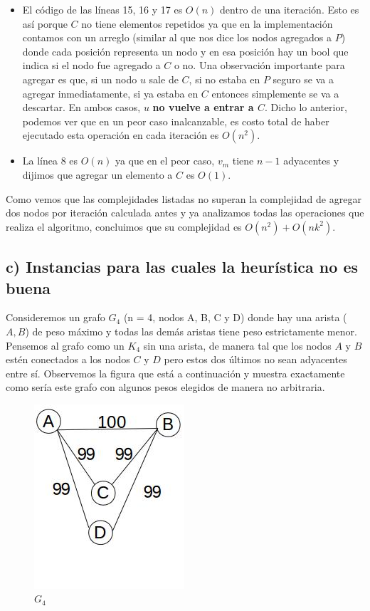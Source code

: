 \documentclass[a4paper]{article}
\begin{document}
\begin{itemize}
\item El código de las líneas 15, 16 y 17 es $O(n)$ dentro de una iteración. Esto es así porque $C$ no tiene elementos repetidos ya que en la implementación contamos con un arreglo (similar al que nos dice los nodos agregados a $P$) donde cada posición representa un nodo y en esa posición hay un bool que indica si el nodo fue agregado a $C$ o no. Una observación importante para agregar es que, si un nodo $u$ sale de $C$, si no estaba en $P$ seguro se va a agregar inmediatamente, si ya estaba en $C$ entonces simplemente se va a descartar. En ambos casos, $u$ \textbf{no vuelve a entrar a $C$}. Dicho lo anterior, podemos ver que en un peor caso inalcanzable, es costo total de haber ejecutado esta operación en cada iteración es $O(n^2)$.
\item La línea 8 es $O(n)$ ya que en el peor caso, $v_m$ tiene $n - 1$ adyacentes y dijimos que agregar un elemento a $C$ es $O(1)$.
\end{itemize}

\vspace{0.3cm}
Como vemos que las complejidades listadas no superan la complejidad de agregar dos nodos por iteración calculada antes y ya analizamos todas las operaciones que realiza el algoritmo, concluimos que su complejidad es $O(n^2) + O(nk^2)$.
\vspace{0.8cm}
\subsection*{c) Instancias para las cuales la heurística no es buena}
Consideremos un grafo $G_4$ (n = 4, nodos A, B, C y D) donde hay una arista ($A, B$) de peso máximo y todas las demás aristas tiene peso estrictamente menor. Pensemos al grafo como un $K_4$ sin una arista, de manera tal que los nodos $A$ y $B$ estén conectados a los nodos $C$ y $D$ pero estos dos últimos no sean adyacentes entre sí.
\newline Observemos la figura que está a continuación y muestra exactamente como sería este grafo con algunos pesos elegidos de manera no arbitraria.
\begin{figure}[h]
\centering
\includegraphics[scale=0.8]{grafoHGolosaMala1.jpg}\caption{$G_4$}
\end{figure}
\pagebreak
\end{document}
